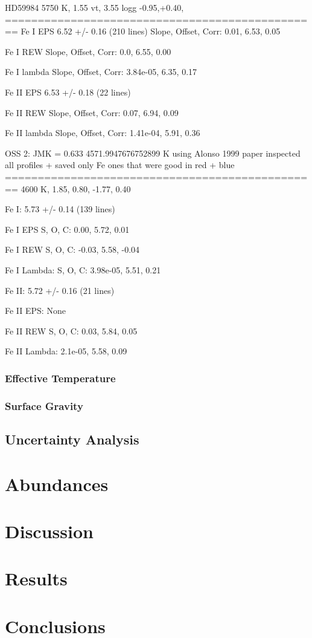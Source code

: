 \documentclass{emulateapj}
\begin{document}
HD59984 5750 K, 1.55 vt, 3.55 logg -0.95,+0.40,
================================================
Fe I EPS 6.52 +/- 0.16 (210 lines)
Slope, Offset, Corr: 0.01, 6.53, 0.05

Fe I REW
Slope, Offset, Corr: 0.0, 6.55, 0.00

Fe I lambda
Slope, Offset, Corr: 3.84e-05, 6.35, 0.17

Fe II EPS 6.53 +/- 0.18 (22 lines)

Fe II REW
Slope, Offset, Corr: 0.07, 6.94, 0.09

Fe II lambda
Slope, Offset, Corr: 1.41e-04, 5.91, 0.36


OSS 2: JMK = 0.633
4571.9947676752899 K using Alonso 1999 paper
inspected all profiles + saved only Fe ones that were good in red + blue
================================================
4600 K, 1.85, 0.80, -1.77, 0.40

Fe I: 5.73 +/- 0.14 (139 lines)

Fe I EPS
S, O, C: 0.00, 5.72, 0.01

Fe I REW
S, O, C: -0.03, 5.58, -0.04

Fe I Lambda:
S, O, C: 3.98e-05, 5.51, 0.21

Fe II: 5.72 +/- 0.16 (21 lines)

Fe II EPS: None

Fe II REW S, O, C: 0.03, 5.84, 0.05

Fe II Lambda: 2.1e-05, 5.58, 0.09





\subsubsection{Effective Temperature}

\subsubsection{Surface Gravity}

\subsection{Uncertainty Analysis}


\section{Abundances}


\section{Discussion}

\section{Results}

\section{Conclusions}
\end{document}
